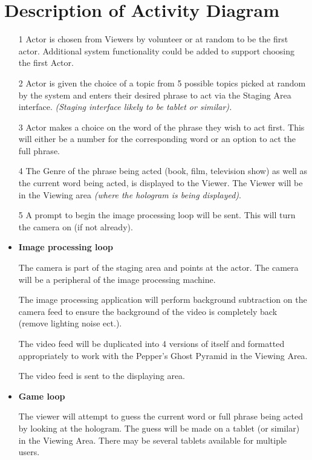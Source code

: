\documentclass{article}
\begin{document}
\section{Description of Activity Diagram}
\begin{itemize}
	\item [1] Actor is chosen from Viewers by volunteer or at random to be the first actor. Additional system functionality could be added to support choosing the first Actor.
	
	\item [2] Actor is given the choice of a topic from 5 possible topics picked at random by the system and enters their desired phrase to act via the Staging Area interface. \textit{(Staging interface likely to be tablet or similar).}
	
	\item [3] Actor makes a choice on the word of the phrase they wish to act first. This will either be a number for the corresponding word or an option to act the full phrase.
	
	\item [4] The Genre of the phrase being acted (book, film, television show) as well as the current word being acted, is displayed to the Viewer. The Viewer will be in the Viewing area \textit{(where the hologram is being displayed)}.
	
	\item [5] A prompt to begin the image processing loop will be sent. This will turn the camera on (if not already).  
	
	\item \textbf{Image processing loop}

	\subitem [A1] The camera is part of the staging area and points at the actor. The camera will be a peripheral of the image processing machine.
	
	\subitem [A2] The image processing application will perform background subtraction on the camera feed to ensure the background of the video is completely back (remove lighting noise ect.).
	
	\subitem [A3] The video feed will be duplicated into 4 versions of itself and formatted appropriately to work with the Pepper's Ghost Pyramid in the Viewing Area.
	
	\subitem [A4] The video feed is sent to the displaying area.
	
	\item \textbf{Game loop}	
	
	\subitem [B1] The viewer will attempt to guess the current word or full phrase being acted by looking at the hologram. The guess will be made on a tablet (or similar) in the Viewing Area. There may be several tablets available for multiple users.
	

\end{itemize}
\end{document}
